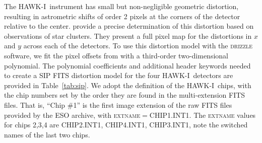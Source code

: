 \documentclass[preprint2]{aastex6}
\gdef\HAWKI{\mbox{HAWK-I}}
\begin{document}
The \HAWKI\ instrument has small but non-negligible geometric distortion, resulting in astrometric shifts of order 2 pixels at the corners of the detector relative to the center.  \cite{libralato:14} provide a precise determination of this distortion based on observations of star clusters.  They present a full pixel map for the distortions in $x$ and $y$ across each of the detectors.  To use this distortion model with the \textsc{drizzle} software, we fit the pixel offsets from \cite{libralato:14} with a third-order two-dimensional polynomial.  The polynomial coefficients and additional header keywords needed to create a SIP FITS distortion model \citep{fits:sip} for the four \HAWKI\ detectors are provided in Table~\ref{tab:sip}.  We adopt the \cite{libralato:14} definition of the \HAWKI\ chips, with the chip numbers set by the order they are found in the multi-extension FITS files.  That is, ``Chip \#1'' is the first image extension of the raw FITS files provided by the ESO archive, with \textsc{extname}$=$CHIP1.INT1.  The \textsc{extname} values for chips 2,3,4 are CHIP2.INT1, CHIP4.INT1, CHIP3.INT1, note the switched names of the last two chips.
\end{document}
